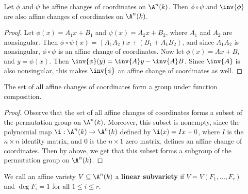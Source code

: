 \begin{theorem}\label{theorem_2.2.3}
  Let $\phi$ and $\psi$ be affine changes of coordinates on $\A^n(k)$. Then
  $\phi \circ \psi$ and $\inv{\phi}$ are also affine changes of coordinates on
  $\A^n(k)$.
\end{theorem}
\begin{proof}
  Let $\phi(x)=A_1x+B_1$ and $\psi(x)=A_2x+B_2$, where $A_1$ and $A_2$ are
  nonsingular. Then $\phi \circ \psi(x)=(A_1A_2)x+(B_1+A_1B_2)$, and since
  $A_1A_2$ is nonsingular, $\phi \circ \psi$ is an affine change of coordinates.
  Now let  $\phi(x)=Ax+B$, and $y=\phi(x)$. Then
  $\inv{\phi}(y)=\inv{A}y-\inv{A}B$. Since $\inv{A}$ is also nonsingular, this
  makes $\inv{\phi}$ an affine change of coordinates as well.
\end{proof}
\begin{corollary}
  The set of all affine changes of coordinates form a group under function
  composition.
\end{corollary}
\begin{proof}
  Observe that the set of all affine changes of coordinates forms a subset of
  the permutation group on $\A^n(k)$. Moreover, this subset is nonempty, since
  the polynomial map $\i:\A^n(k) \xrightarrow{} \A^n(k)$ defined by
  $\i(x)=Ix+0$, where $I$ is the $n \times n$ identity matrix, and $0$ is the
  $n \times 1$ zero matrix, defines an affine change of coordinates. Then by
  above, we get that this subset forms a subgroup of the permutation group on
  $\A^n(k)$.
\end{proof}

\begin{definition}
  We call an affine variety $V \subseteq \A^n(k)$ a \textbf{linear subvariety}
  if $V=V(F_1, \dots, F_r)$ and $\deg{F_i}=1$ for all $1 \leq i \leq r$.
\end{definition}

